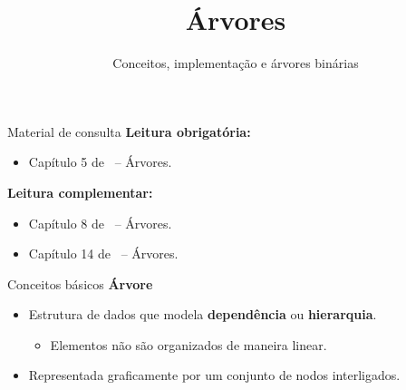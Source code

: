 \newcommand{\defs}{../defs}


\title[Árvores]{Árvores}
\subtitle{Conceitos, implementação e árvores binárias}


\immediate{}
\immediate{}
\immediate{}
\immediate{}



\maketitle

\begin{frame}{Material de consulta}
	\textbf{Leitura obrigatória:}
	\begin{itemize}
		\item Capítulo 5 de~\cite{EdelweissAndGalante2009} -- Árvores.
	\end{itemize}
	
	\bigskip
	
	\textbf{Leitura complementar:}
	\begin{itemize}
		\item Capítulo 8 de~\cite{GoodrichEtAl2014} -- Árvores.
		\item Capítulo 14 de~\cite{Pereira2008} -- Árvores.
	\end{itemize}
\end{frame}


\begin{frame}{Conceitos básicos}
	\textbf{Árvore}
	\begin{itemize}
		\item Estrutura de dados que modela \textbf{dependência} ou \textbf{hierarquia}.
		\begin{itemize}
			\item Elementos não são organizados de maneira linear.
		\end{itemize}
	
		\item Representada graficamente por um conjunto de nodos interligados.
	\end{itemize}
	
	\bigskip
	
	\begin{figure}
		
	\end{figure}
\end{frame}


